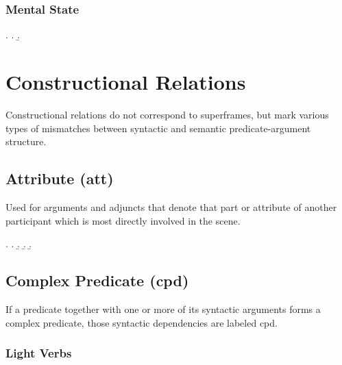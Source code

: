 \documentclass[a4paper]{article}
\begin{document}
\subsubsection{Mental State}

\ex.
\a. 
\b. 


\clearpage
\section{Constructional Relations}

Constructional relations do not correspond to superframes, but mark various
types of mismatches between syntactic and semantic predicate-argument
structure.


\clearpage
\subsection{Attribute (\textsf{att})}
\label{sec:att}

Used for arguments and adjuncts that denote that part or attribute of another
participant which is most directly involved in the scene.

\ex.
\a. 
\b. 
\b. 
\b. 


\clearpage
\subsection{Complex Predicate (\textsf{cpd})}
\label{sec:cpd}

If a predicate together with one or more of its syntactic arguments forms a
complex predicate, those syntactic dependencies are labeled \textsf{cpd}.

\subsubsection{Light Verbs}
\end{document}
